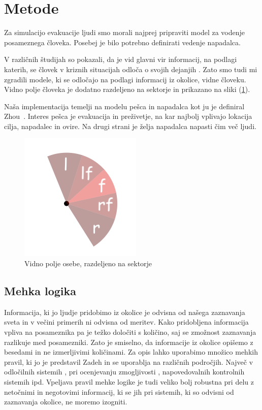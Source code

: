 \documentclass[9pt]{pnas-new}
\begin{document}
\section*{Metode}
Za simulacijo evakuacije ljudi smo morali najprej pripraviti model za vodenje posameznega človeka. Posebej je bilo potrebno definirati vedenje napadalca.

V različnih študijah so pokazali, da je vid glavni vir informacij, na podlagi katerih, se človek v kriznih situacijah odloča o svojih dejanjih \cite{brcdp2018, mht2011}. Zato smo tudi mi zgradili modele, ki se odločajo na podlagi informacij iz okolice, vidne človeku. Vidno polje človeka je dodatno razdeljeno na sektorje in prikazano na sliki (\ref{fig:vision_field}). 

Naša implementacija temelji na modelu pešca in napadalca kot ju je definiral Zhou~\cite{Zhou2016}. Interes pešca je evakuacija in preživetje, na kar najbolj vplivajo lokacija cilja, napadalec in ovire. Na drugi strani je želja napadalca napasti čim več ljudi.

\begin{figure}
	\centering
	\includegraphics[scale=1.0]{fig/vidno_polje_osebe_2.png}
	\caption{Vidno polje osebe, razdeljeno na sektorje}
	\label{fig:vision_field}
\end{figure}

\subsection*{Mehka logika}
\label{mehka_logika}
Informacija, ki jo ljudje pridobimo iz okolice je odvisna od našega zaznavanja sveta in v večini primerih ni odvisna od meritev. Kako pridobljena informacija vpliva na posameznika pa je težko določiti s količino, saj se zmožnost zaznavanja razlikuje med posamezniki. Zato je smiselno, da informacije iz okolice opišemo z besedami in ne izmerljivimi količinami. Za opis lahko uporabimo množico mehkih pravil, ki jo je predstavil Zadeh \cite{ZADEH1965338} in se uporablja na različnih področjih. Največ v odločilnih sistemih \cite{Dong2013}, pri ocenjevanju zmogljivosti \cite{HWWDGHJZN1969}, napovedovalnih kontrolnih sistemih \cite{en10060794} ipd. Vpeljava pravil mehke logike je tudi veliko bolj robustna pri delu z netočnimi in negotovimi informacij, ki se jih pri sistemih, ki so odvisni od zaznavanja okolice, ne moremo izogniti.
\end{document}
